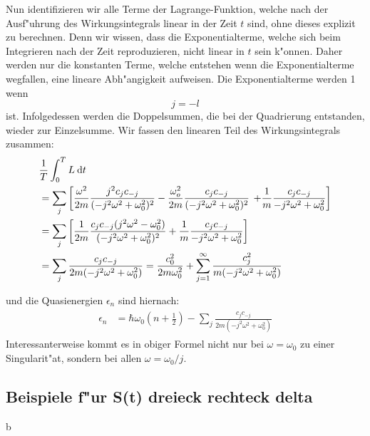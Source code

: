    Nun identifizieren wir alle Terme der Lagrange-Funktion, welche nach der Ausf"uhrung des Wirkungsintegrals linear in der Zeit $t$ sind, ohne dieses explizit zu berechnen.
   Denn wir wissen, dass die Exponentialterme, welche sich beim Integrieren nach der Zeit reproduzieren, nicht linear in $t$ sein k"onnen.
   Daher werden nur die konstanten Terme, welche entstehen wenn die Exponentialterme wegfallen, eine lineare Abh"angigkeit aufweisen.
   Die Exponentialterme werden 1 wenn
   \begin{equation}
     j=-l
   \end{equation}
   ist.
   Infolgedessen werden die Doppelsummen, die bei der Quadrierung entstanden, wieder zur Einzelsumme.
   Wir fassen den linearen Teil des Wirkungsintegrals zusammen:
   \begin{align}
     \begin{split}
       &\frac{1}{T} \int_0^T L \: \text d t \\
       &= \sum_j \left[\frac{\omega^2}{2m} \frac{j^2c_jc_{-j}}{(-j^2\omega^2+\omega_0^2)^2}
       - \frac{\omega_o^2}{2m} \frac{c_jc_{-j}}{(-j^2\omega^2+\omega_0^2)^2} \right.
       \left. +\frac{1}{m} \frac{c_jc_{-j}}{-j^2\omega^2+\omega_0^2}
       \right]\\
       &= \sum_j \left[\frac{1}{2m} \frac{c_jc_{-j}(j^2\omega^2-\omega_0^2)}{(-j^2\omega^2+\omega_0^2)^2} + \frac{1}{m} \frac{c_jc_{-j}}{-j^2\omega^2+\omega_0^2} \right] \\
       &= \sum_j \frac{c_jc_{-j}}{2m(-j^2\omega^2+\omega_0^2)} = \frac{c_0^2}{2m\omega_0^2} + \sum_{j=1}^\infty \frac{c_j^2}{m(-j^2\omega^2+\omega_0^2)}
     \end{split}
   \end{align}

    und die Quasienergien $\epsilon_n$ sind hiernach:
   \begin{align}
     \begin{split}
       \epsilon_n &= \hbar \omega_0(n+\frac{1}{2}) - \sum_j \frac{c_jc_{-j}}{2m(-j^2\omega^2+\omega_0^2)}
     \end{split}
   \end{align}
   Interessanterweise kommt es in obiger Formel nicht nur bei $\omega = \omega_0$ zu einer Singularit"at, sondern bei allen $\omega = \omega_0 / j$.



   \subsection{Beispiele f"ur S(t) dreieck rechteck delta}





























   b
